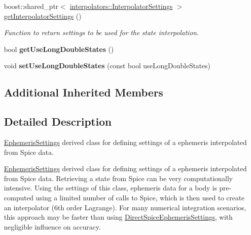 \begin{DoxyCompactItemize}
boost\+::shared\+\_\+ptr$<$ \hyperlink{classtudat_1_1interpolators_1_1InterpolatorSettings}{interpolators\+::\+Interpolator\+Settings} $>$ \hyperlink{classtudat_1_1simulation__setup_1_1InterpolatedSpiceEphemerisSettings_ab2fa9fe08dde3660a5503e3b3852b4af}{get\+Interpolator\+Settings} ()
\begin{DoxyCompactList}\small\item\em Function to return settings to be used for the state interpolation. \end{DoxyCompactList}\item 
bool {\bfseries get\+Use\+Long\+Double\+States} ()\hypertarget{classtudat_1_1simulation__setup_1_1InterpolatedSpiceEphemerisSettings_a2d445496b349d60706ad2ac0e5e27e91}{}\label{classtudat_1_1simulation__setup_1_1InterpolatedSpiceEphemerisSettings_a2d445496b349d60706ad2ac0e5e27e91}

\item 
void {\bfseries set\+Use\+Long\+Double\+States} (const bool use\+Long\+Double\+States)\hypertarget{classtudat_1_1simulation__setup_1_1InterpolatedSpiceEphemerisSettings_a486fa22993d27966420123d91c9d69c9}{}\label{classtudat_1_1simulation__setup_1_1InterpolatedSpiceEphemerisSettings_a486fa22993d27966420123d91c9d69c9}

\end{DoxyCompactItemize}
\subsection*{Additional Inherited Members}


\subsection{Detailed Description}
\hyperlink{classtudat_1_1simulation__setup_1_1EphemerisSettings}{Ephemeris\+Settings} derived class for defining settings of a ephemeris interpolated from Spice data.

\hyperlink{classtudat_1_1simulation__setup_1_1EphemerisSettings}{Ephemeris\+Settings} derived class for defining settings of a ephemeris interpolated from Spice data. Retrieving a state from Spice can be very computationally intensive. Using the settings of this class, ephemeris data for a body is pre-\/computed using a limited number of calls to Spice, which is then used to create an interpolator (6th order Lagrange). For many numerical integration scenarios, this approach may be faster than using \hyperlink{classtudat_1_1simulation__setup_1_1DirectSpiceEphemerisSettings}{Direct\+Spice\+Ephemeris\+Settings}, with negligible influence on accuracy. 

